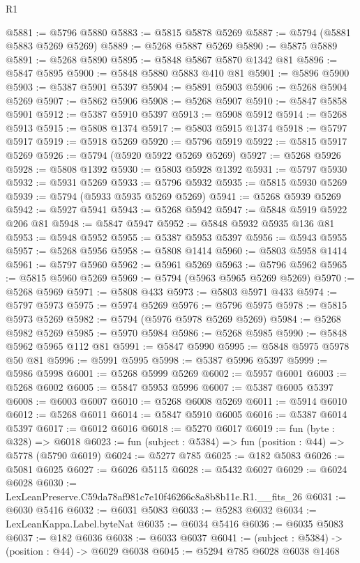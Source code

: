 \begin{lexlean}{R1}
\begin{coremodule}
@5881 := @5796 @5880
@5883 := @5815 @5878 @5269
@5887 := @5794 (@5881 @5883 @5269 @5269)
@5889 := @5268 @5887 @5269
@5890 := @5875 @5889
@5891 := @5268 @5890
@5895 := @5848 @5867 @5870 @1342 @81
@5896 := @5847 @5895
@5900 := @5848 @5880 @5883 @410 @81
@5901 := @5896 @5900
@5903 := @5387 @5901 @5397
@5904 := @5891 @5903
@5906 := @5268 @5904 @5269
@5907 := @5862 @5906
@5908 := @5268 @5907
@5910 := @5847 @5858 @5901
@5912 := @5387 @5910 @5397
@5913 := @5908 @5912
@5914 := @5268 @5913
@5915 := @5808 @1374
@5917 := @5803 @5915 @1374
@5918 := @5797 @5917
@5919 := @5918 @5269
@5920 := @5796 @5919
@5922 := @5815 @5917 @5269
@5926 := @5794 (@5920 @5922 @5269 @5269)
@5927 := @5268 @5926
@5928 := @5808 @1392
@5930 := @5803 @5928 @1392
@5931 := @5797 @5930
@5932 := @5931 @5269
@5933 := @5796 @5932
@5935 := @5815 @5930 @5269
@5939 := @5794 (@5933 @5935 @5269 @5269)
@5941 := @5268 @5939 @5269
@5942 := @5927 @5941
@5943 := @5268 @5942
@5947 := @5848 @5919 @5922 @206 @81
@5948 := @5847 @5947
@5952 := @5848 @5932 @5935 @136 @81
@5953 := @5948 @5952
@5955 := @5387 @5953 @5397
@5956 := @5943 @5955
@5957 := @5268 @5956
@5958 := @5808 @1414
@5960 := @5803 @5958 @1414
@5961 := @5797 @5960
@5962 := @5961 @5269
@5963 := @5796 @5962
@5965 := @5815 @5960 @5269
@5969 := @5794 (@5963 @5965 @5269 @5269)
@5970 := @5268 @5969
@5971 := @5808 @433
@5973 := @5803 @5971 @433
@5974 := @5797 @5973
@5975 := @5974 @5269
@5976 := @5796 @5975
@5978 := @5815 @5973 @5269
@5982 := @5794 (@5976 @5978 @5269 @5269)
@5984 := @5268 @5982 @5269
@5985 := @5970 @5984
@5986 := @5268 @5985
@5990 := @5848 @5962 @5965 @112 @81
@5991 := @5847 @5990
@5995 := @5848 @5975 @5978 @50 @81
@5996 := @5991 @5995
@5998 := @5387 @5996 @5397
@5999 := @5986 @5998
@6001 := @5268 @5999 @5269
@6002 := @5957 @6001
@6003 := @5268 @6002
@6005 := @5847 @5953 @5996
@6007 := @5387 @6005 @5397
@6008 := @6003 @6007
@6010 := @5268 @6008 @5269
@6011 := @5914 @6010
@6012 := @5268 @6011
@6014 := @5847 @5910 @6005
@6016 := @5387 @6014 @5397
@6017 := @6012 @6016
@6018 := @5270 @6017
@6019 := fun (byte : @328) => @6018
@6023 := fun (subject : @5384) => fun (position : @44) => @5778 (@5790 @6019)
@6024 := @5277 @785
@6025 := @182 @5083
@6026 := @5081 @6025
@6027 := @6026 @5115
@6028 := @5432 @6027
@6029 := @6024 @6028
@6030 := LexLeanPreserve.C59da78af981c7e10f46266c8a8b8b11e.R1.__fits_26
@6031 := @6030 @5416
@6032 := @6031 @5083
@6033 := @5283 @6032
@6034 := LexLeanKappa.Label.byteNat
@6035 := @6034 @5416
@6036 := @6035 @5083
@6037 := @182 @6036
@6038 := @6033 @6037
@6041 := (subject : @5384) -> (position : @44) -> @6029 @6038
@6045 := @5294 @785 @6028 @6038 @1468

\end{coremodule}
\end{lexlean}
